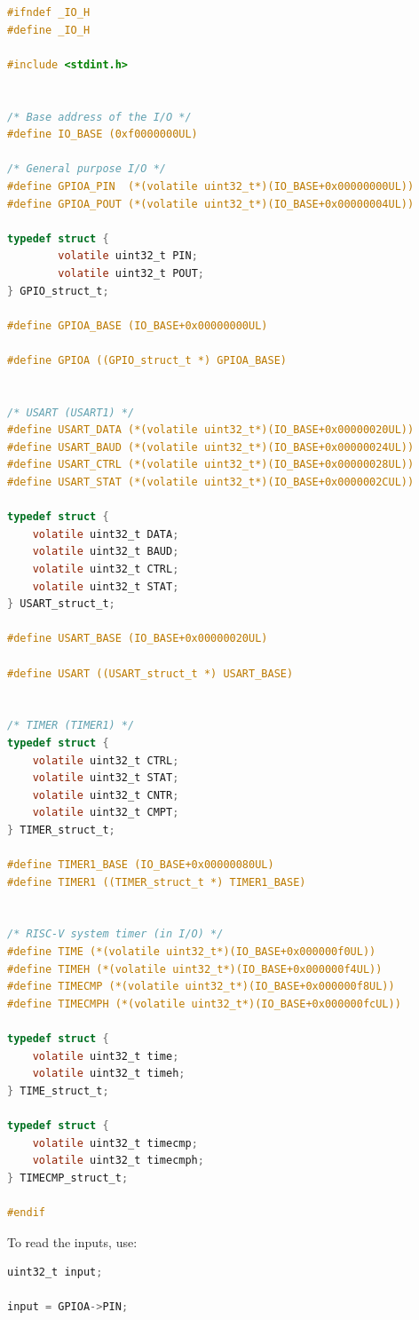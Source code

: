\documentclass[12pt]{article}
\begin{document}
\begin{lstlisting}[language=C]
#ifndef _IO_H
#define _IO_H

#include <stdint.h>


/* Base address of the I/O */
#define IO_BASE (0xf0000000UL)

/* General purpose I/O */
#define GPIOA_PIN  (*(volatile uint32_t*)(IO_BASE+0x00000000UL))
#define GPIOA_POUT (*(volatile uint32_t*)(IO_BASE+0x00000004UL))

typedef struct {
        volatile uint32_t PIN;
        volatile uint32_t POUT;
} GPIO_struct_t;

#define GPIOA_BASE (IO_BASE+0x00000000UL)

#define GPIOA ((GPIO_struct_t *) GPIOA_BASE)


/* USART (USART1) */
#define USART_DATA (*(volatile uint32_t*)(IO_BASE+0x00000020UL))
#define USART_BAUD (*(volatile uint32_t*)(IO_BASE+0x00000024UL))
#define USART_CTRL (*(volatile uint32_t*)(IO_BASE+0x00000028UL))
#define USART_STAT (*(volatile uint32_t*)(IO_BASE+0x0000002CUL))

typedef struct {
	volatile uint32_t DATA;
	volatile uint32_t BAUD;
	volatile uint32_t CTRL;
	volatile uint32_t STAT;
} USART_struct_t;

#define USART_BASE (IO_BASE+0x00000020UL)

#define USART ((USART_struct_t *) USART_BASE)


/* TIMER (TIMER1) */
typedef struct {
	volatile uint32_t CTRL;
	volatile uint32_t STAT;
	volatile uint32_t CNTR;
	volatile uint32_t CMPT;
} TIMER_struct_t;

#define TIMER1_BASE (IO_BASE+0x00000080UL)
#define TIMER1 ((TIMER_struct_t *) TIMER1_BASE)


/* RISC-V system timer (in I/O) */
#define TIME (*(volatile uint32_t*)(IO_BASE+0x000000f0UL))
#define TIMEH (*(volatile uint32_t*)(IO_BASE+0x000000f4UL))
#define TIMECMP (*(volatile uint32_t*)(IO_BASE+0x000000f8UL))
#define TIMECMPH (*(volatile uint32_t*)(IO_BASE+0x000000fcUL))

typedef struct {
	volatile uint32_t time;
	volatile uint32_t timeh;
} TIME_struct_t;

typedef struct {
	volatile uint32_t timecmp;
	volatile uint32_t timecmph;
} TIMECMP_struct_t;

#endif
\end{lstlisting}

To read the inputs, use:

\begin{lstlisting}[language=C]
uint32_t input;

input = GPIOA->PIN;
\end{lstlisting}
\end{document}

